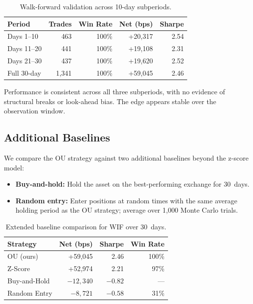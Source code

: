 \documentclass[sigconf,nonacm=false]{acmart}
\begin{document}
\begin{table}[h]
\caption{Walk-forward validation across 10-day subperiods.}
\label{tab:walkforward}
\begin{tabular}{lrrrr}
\toprule
\textbf{Period} & \textbf{Trades} & \textbf{Win Rate} & \textbf{Net (bps)} & \textbf{Sharpe} \\
\midrule
Days 1--10   & 463  & 100\% & +20,317 & 2.54 \\
Days 11--20  & 441  & 100\% & +19,108 & 2.31 \\
Days 21--30  & 437  & 100\% & +19,620 & 2.52 \\
\midrule
Full 30-day  & 1,341 & 100\% & +59,045 & 2.46 \\
\bottomrule
\end{tabular}
\end{table}

Performance is consistent across all three subperiods, with no evidence of structural breaks or look-ahead bias. The edge appears stable over the observation window.

\subsection{Additional Baselines}\label{sec:baselines}

We compare the OU strategy against two additional baselines beyond the z-score model:

\begin{itemize}
    \item \textbf{Buy-and-hold:} Hold the asset on the best-performing exchange for 30~days.
    \item \textbf{Random entry:} Enter positions at random times with the same average holding period as the OU strategy; average over 1,000 Monte Carlo trials.
\end{itemize}

\begin{table}[h]
\caption{Extended baseline comparison for WIF over 30~days.}
\label{tab:baselines}
\begin{tabular}{lrrr}
\toprule
\textbf{Strategy} & \textbf{Net (bps)} & \textbf{Sharpe} & \textbf{Win Rate} \\
\midrule
OU (ours)       & +59,045 & 2.46 & 100\% \\
Z-Score         & +52,974 & 2.21 & 97\% \\
Buy-and-Hold    & $-12,340$ & $-0.82$ & --- \\
Random Entry    & $-8,721$ & $-0.58$ & 31\% \\
\bottomrule
\end{tabular}
\end{table}
\end{document}
